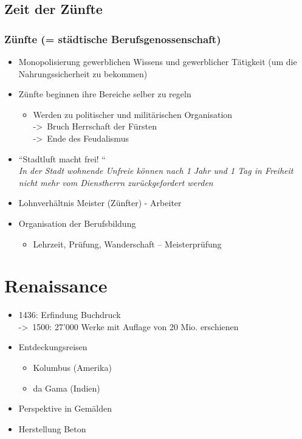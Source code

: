 \documentclass{report}
\begin{document}
\newpage

\subsection{Zeit der Zünfte}
\subsubsection{Zünfte \rm{(= städtische Berufsgenossenschaft)}}
\begin{itemize}
	\item Monopolisierung gewerblichen Wissens und gewerblicher Tätigkeit (um die Nahrungssicherheit zu bekommen)
	\item Zünfte beginnen ihre Bereiche selber zu regeln
		\begin{itemize}
			\item Werden zu politischer und militärischen Organisation\\
			-\textgreater~Bruch Herrschaft der Fürsten\\
			-\textgreater~Ende des Feudalismus
		\end{itemize}
	\item ``Stadtluft macht frei! ``\\
		\textit{In der Stadt wohnende Unfreie können nach 1 Jahr und 1 Tag in Freiheit nicht mehr vom Dienstherrn zurückgefordert werden}
	\item Lohnverhältnis Meister (Zünfter) - Arbeiter
	\item Organisation der Berufsbildung 
		\begin{itemize}
			\item Lehrzeit, Prüfung, Wanderschaft – Meisterprüfung
		\end{itemize}
\end{itemize}

\section{Renaissance}
\begin{itemize}
	\item 1436: Erfindung Buchdruck\\
	-\textgreater~1500: 27'000 Werke mit Auflage von 20 Mio. erschienen
	\item Entdeckungsreisen
		\begin{itemize}
			\item Kolumbus (Amerika)
			\item da Gama (Indien)
		\end{itemize}
	\item Perspektive in Gemälden
	\item Herstellung Beton
\end{itemize}
\end{document}

